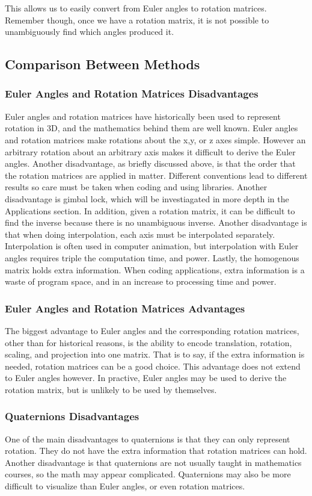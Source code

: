 This allows us to easily convert from Euler angles to rotation matrices.
Remember though, once we have a rotation matrix, it is not possible to unambiguously find which angles produced it.


\subsection{Comparison Between Methods}
\subsubsection{Euler Angles and Rotation Matrices Disadvantages}
Euler angles and rotation matrices have historically been used to represent rotation in 3D, and the mathematics behind them are well known.
Euler angles and rotation matrices make rotations about the x,y, or z axes simple.
However an arbitrary rotation about an arbitrary axis makes it difficult to derive the Euler angles.
Another disadvantage, as briefly discussed above, is that the order that the rotation matrices are applied in matter.
Different conventions lead to different results so care must be taken when coding and using libraries.
Another disadvantage is gimbal lock, which will be investiagated in more depth in the Applications section.
In addition, given a rotation matrix, it can be difficult to find the inverse because there is no unambiguous inverse.
Another disadvantage is that when doing interpolation, each axis must be interpolated separately.
Interpolation is often used in computer animation, but interpolation with Euler angles requires triple the computation time, and power.
Lastly, the homogenous matrix holds extra information.
When coding applications, extra information is a waste of program space, and in an increase to processing time and power.
\subsubsection{Euler Angles and Rotation Matrices Advantages}
The biggest advantage to Euler angles and the corresponding rotation matrices, other than for historical reasons, is the ability to encode translation, rotation, scaling, and projection into one matrix.
That is to say, if the extra information is needed, rotation matrices can be a good choice.
This advantage does not extend to Euler angles however.
In practive, Euler angles may be used to derive the rotation matrix, but is unlikely to be used by themselves.
\subsubsection{Quaternions Disadvantages}
One of the main disadvantages to quaternions is that they can only represent rotation.
They do not have the extra information that rotation matrices can hold.
Another disadvantage is that quaternions are not usually taught in mathematics courses, so the math may appear complicated.
Quaternions may also be more difficult to visualize than Euler angles, or even rotation matrices.
